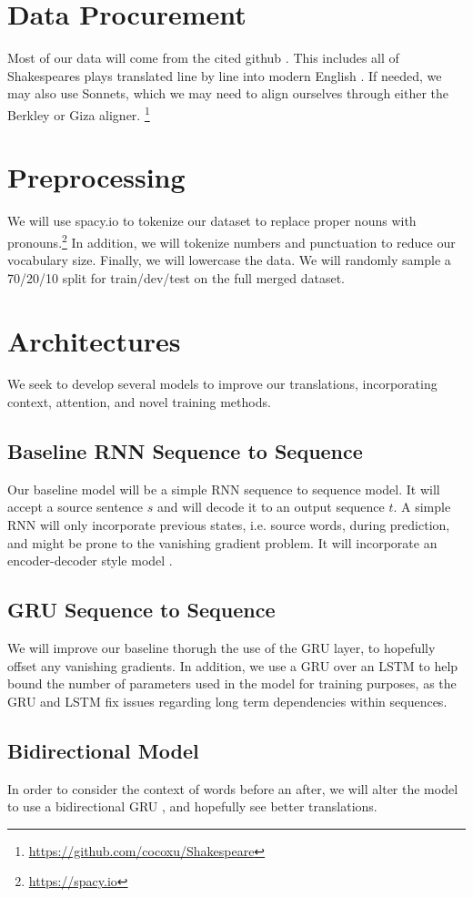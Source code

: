\documentclass[twoside,twocolumn]{article}
\begin{document}
\section{Data Procurement}
Most of our data will come from the cited github \cite{xu2012paraphrasing}. This includes all of Shakespeares plays translated line by line into modern English . If needed, we may also use Sonnets, which we may need to align ourselves through either the Berkley or Giza aligner. \footnote{\url{https://github.com/cocoxu/Shakespeare}}

\section{Preprocessing}
We will use spacy.io to tokenize our dataset to replace proper nouns with pronouns.\footnote{\url{https://spacy.io}} In addition, we will tokenize numbers and punctuation to reduce our vocabulary size. Finally, we will lowercase the data. We will randomly sample a 70/20/10 split for train/dev/test on the full merged dataset.

\section{Architectures}
We seek to develop several models to improve our translations, incorporating context, attention, and novel training methods.

\subsection{Baseline RNN Sequence to Sequence}
Our baseline model will be a simple RNN sequence to sequence model. It will accept a source sentence $s$ and will decode it to an output sequence $t$. A simple RNN will only incorporate previous states, i.e. source words, during prediction, and might be prone to the vanishing gradient problem. It will incorporate an encoder-decoder style model \cite{cho2014learning} \cite{sutskever2014sequence}.
\subsection{GRU Sequence to Sequence}
We will improve our baseline thorugh the use of the GRU layer, to hopefully offset any vanishing gradients. In addition, we use a GRU over an LSTM to help bound the number of parameters used in the model for training purposes, as the GRU and LSTM fix issues regarding long term dependencies within sequences.
\subsection{Bidirectional Model}
In order to consider the context of words before an after, we will alter the model to use a bidirectional GRU \cite{bahdanau2014neural}, and hopefully see better translations.
\end{document}
